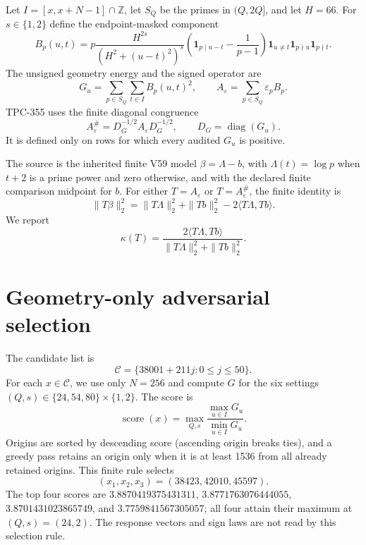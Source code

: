 \documentclass[10pt]{article}
\newcommand{\kappaout}{\kappa}
\begin{document}
Let $I=[x,x+N-1]\cap\mathbb Z$, let $S_Q$ be the primes in $(Q,2Q]$, and
let $H=66$.  For $s\in\{1,2\}$ define the endpoint-masked component
\begin{equation}
 B_p(u,t)=p\frac{H^{2s}}{(H^2+(u-t)^2)^s}
 \left(\mathbf 1_{p\mid u-t}-\frac{1}{p-1}\right)
 \mathbf 1_{u\ne t}\mathbf 1_{p\nmid u}\mathbf 1_{p\nmid t}.
 \label{eq:component}
\end{equation}
The unsigned geometry energy and the signed operator are
\begin{equation}
 G_u=\sum_{p\in S_Q}\sum_{t\in I}B_p(u,t)^2,
 \qquad A_{\varepsilon}=\sum_{p\in S_Q}\varepsilon_p B_p.
 \label{eq:geometry}
\end{equation}
TPC-355 uses the finite diagonal congruence
\begin{equation}
 A_{\varepsilon}^{\#}=D_G^{-1/2}A_{\varepsilon}D_G^{-1/2},
 \qquad D_G=\operatorname{diag}(G_u).
 \label{eq:normalization}
\end{equation}
It is defined only on rows for which every audited $G_u$ is positive.

The source is the inherited finite V59 model
$\beta=\Lambda-b$, with $\Lambda(t)=\log p$ when $t+2$ is a prime power
and zero otherwise, and with the declared finite comparison midpoint for
$b$.  For either $T=A_{\varepsilon}$ or $T=A_{\varepsilon}^{\#}$, the finite
identity is
\begin{equation}
 \|T\beta\|_2^2=\|T\Lambda\|_2^2+\|Tb\|_2^2
 -2\langle T\Lambda,Tb\rangle.
 \label{eq:polarization}
\end{equation}
We report
\begin{equation}
 \kappaout(T)=\frac{2\langle T\Lambda,Tb\rangle}
 {\|T\Lambda\|_2^2+\|Tb\|_2^2}.
 \label{eq:kappa}
\end{equation}

\section{Geometry-only adversarial selection}

The candidate list is
\[
 \mathcal C=\{38001+211j:0\leq j\leq 50\}.
\]
For each $x\in\mathcal C$, we use only $N=256$ and compute $G$ for the six
settings $(Q,s)\in\{24,54,80\}\times\{1,2\}$.  The score is
\[
 \operatorname{score}(x)=\max_{Q,s}\frac{\max_{u\in I}G_u}
 {\min_{u\in I}G_u}.
\]
Origins are sorted by descending score (ascending origin breaks ties), and a
greedy pass retains an origin only when it is at least 1536 from all already
retained origins.  This finite rule selects
\[
 (x_1,x_2,x_3)=(38423,42010,45597).
\]
The top four scores are $3.8870419375431311$,
$3.8771763076444055$, $3.8701431023865749$, and
$3.7759841567305057$; all four attain their maximum at $(Q,s)=(24,2)$.
The response vectors and sign laws are not read by this selection rule.
\end{document}
